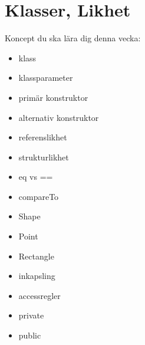 \chapter{Klasser, Likhet}\label{chapter:W06}
Koncept du ska lära dig denna vecka:
\begin{multicols}{2}\begin{itemize}[nosep,label={$\square$},leftmargin=*]
\item klass
\item klassparameter
\item primär konstruktor
\item alternativ konstruktor
\item referenslikhet
\item strukturlikhet
\item eq vs ==
\item compareTo
\item Shape
\item Point
\item Rectangle
\item inkapsling
\item accessregler
\item private
\item public\end{itemize}\end{multicols}
